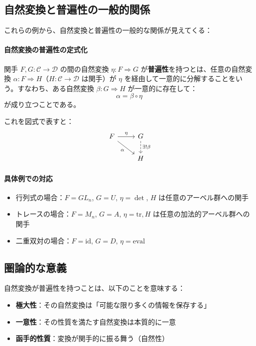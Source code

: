 \documentclass[uplatex,a4j,12pt,dvipdfmx]{jsarticle}
\begin{document}
\subsection{自然変換と普遍性の一般的関係}

これらの例から、自然変換と普遍性の一般的な関係が見えてくる：

\paragraph{自然変換の普遍性の定式化}
関手 $F, G: \mathcal{C} \to \mathcal{D}$ の間の自然変換 $\eta: F \Rightarrow G$ が\textbf{普遍性}を持つとは、任意の自然変換 $\alpha: F \Rightarrow H$（$H: \mathcal{C} \to \mathcal{D}$ は関手）が $\eta$ を経由して一意的に分解することをいう。すなわち、ある自然変換 $\beta: G \Rightarrow H$ が一意的に存在して：
\[
	\alpha = \beta \circ \eta
\]
が成り立つことである。

これを図式で表すと：
\[
	\begin{tikzcd}
		F \arrow[r, "\eta"] \arrow[rd, "\alpha"'] & G \arrow[d, dashed, "\exists! \beta"] \\
		& H
	\end{tikzcd}
\]

\paragraph{具体例での対応}
\begin{itemize}
	\item 行列式の場合：$F = GL_n$, $G = U$, $\eta = \det$, $H$ は任意のアーベル群への関手
	\item トレースの場合：$F = M_n$, $G = A$, $\eta = \text{tr} , H$ は任意の加法的アーベル群への関手
	\item 二重双対の場合：$F = \mathrm{id}$, $G = D$, $\eta = \mathrm{eval}$
\end{itemize}

\subsection{圏論的な意義}

自然変換が普遍性を持つことは、以下のことを意味する：

\begin{itemize}
	\item \textbf{極大性}：その自然変換は「可能な限り多くの情報を保存する」
	\item \textbf{一意性}：その性質を満たす自然変換は本質的に一意
	\item \textbf{函手的性質}：変換が関手的に振る舞う（自然性）
\end{itemize}
\end{document}
